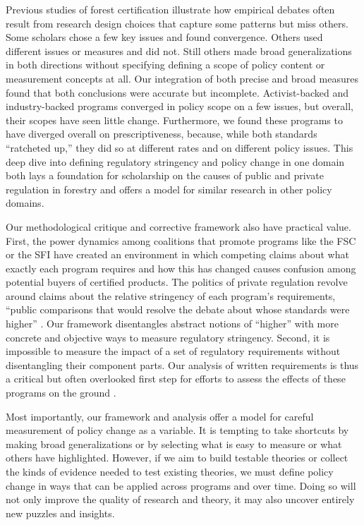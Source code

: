 \documentclass[
      12pt,
            Review ]{article}
\begin{document}
Previous studies of forest certification illustrate how empirical debates often result from research design choices that capture some patterns but miss others. Some scholars chose a few key issues and found convergence. Others used different issues or measures and did not. Still others made broad generalizations in both directions without specifying defining a scope of policy content or measurement concepts at all. Our integration of both precise and broad measures found that both conclusions were accurate but incomplete. Activist-backed and industry-backed programs converged in policy scope on a few issues, but overall, their scopes have seen little change. Furthermore, we found these programs to have diverged overall on prescriptiveness, because, while both standards ``ratcheted up,'' they did so at different rates and on different policy issues. This deep dive into defining regulatory stringency and policy change in one domain both lays a foundation for scholarship on the causes of public and private regulation in forestry and offers a model for similar research in other policy domains.

Our methodological critique and corrective framework also have practical value. First, the power dynamics among coalitions that promote programs like the FSC or the SFI have created an environment in which competing claims about what exactly each program requires and how this has changed causes confusion among potential buyers of certified products. The politics of private regulation revolve around claims about the relative stringency of each program's requirements, ``public comparisons that would resolve the debate about whose standards were higher'' \citep{Overdevest2010}. Our framework disentangles abstract notions of ``higher'' with more concrete and objective ways to measure regulatory stringency. Second, it is impossible to measure the impact of a set of regulatory requirements without disentangling their component parts. Our analysis of written requirements is thus a critical but often overlooked first step for efforts to assess the effects of these programs on the ground \citep{Hamish2018}.

Most importantly, our framework and analysis offer a model for careful measurement of policy change as a variable. It is tempting to take shortcuts by making broad generalizations or by selecting what is easy to measure or what others have highlighted. However, if we aim to build testable theories or collect the kinds of evidence needed to test existing theories, we must define policy change in ways that can be applied across programs and over time. Doing so will not only improve the quality of research and theory, it may also uncover entirely new puzzles and insights.
  \newpage 
  \theendnotes
\newpage
\singlespacing 
           
  
\end{document}
